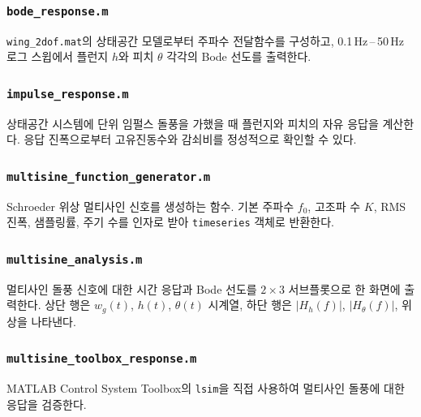 \documentclass[
	a4paper, %
	10pt, %
]{CSUniSchoolLabReport}
\begin{document}
\subsubsection{\texttt{bode\_response.m}}
\texttt{wing\_2dof.mat}의 상태공간 모델로부터 주파수 전달함수를 구성하고,
0.1\,Hz\,--\,50\,Hz 로그 스윕에서 플런지 \(h\)와 피치 \(\theta\) 각각의 Bode 선도를 출력한다.



\subsubsection{\texttt{impulse\_response.m}}
상태공간 시스템에 단위 임펄스 돌풍을 가했을 때 플런지와 피치의 자유 응답을 계산한다.
응답 진폭으로부터 고유진동수와 감쇠비를 정성적으로 확인할 수 있다.



\subsubsection{\texttt{multisine\_function\_generator.m}}
Schroeder 위상 멀티사인 신호를 생성하는 함수.
기본 주파수 \(f_0\), 고조파 수 \(K\), RMS 진폭, 샘플링률, 주기 수를 인자로 받아
\texttt{timeseries} 객체로 반환한다.



\subsubsection{\texttt{multisine\_analysis.m}}
멀티사인 돌풍 신호에 대한 시간 응답과 Bode 선도를 \(2\times3\) 서브플롯으로 한 화면에 출력한다.
상단 행은 \(w_g(t)\), \(h(t)\), \(\theta(t)\) 시계열, 하단 행은 \(|H_h(f)|\), \(|H_\theta(f)|\),
위상을 나타낸다.



\subsubsection{\texttt{multisine\_toolbox\_response.m}}
MATLAB Control System Toolbox의 \texttt{lsim}을 직접 사용하여
멀티사인 돌풍에 대한 응답을 검증한다.
\end{document}
